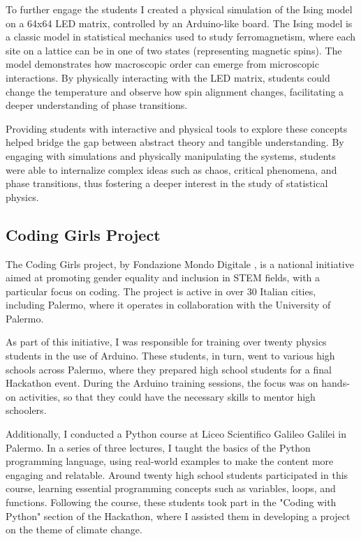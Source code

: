 \documentclass[a4paper, 10pt]{scrartcl}
\begin{document}
To further engage the students I created a physical simulation of the Ising model on a 64x64 LED matrix, controlled by an Arduino-like board. The Ising model is a classic model in statistical mechanics used to study ferromagnetism, where each site on a lattice can be in one of two states (representing magnetic spins). The model demonstrates how macroscopic order can emerge from microscopic interactions. By physically interacting with the LED matrix, students could change the temperature and observe how spin alignment changes, facilitating a deeper understanding of phase transitions.

Providing students with interactive and physical tools to explore these concepts helped bridge the gap between abstract theory and tangible understanding. By engaging with simulations and physically manipulating the systems, students were able to internalize complex ideas such as chaos, critical phenomena, and phase transitions, thus fostering a deeper interest in the study of statistical physics.

\subsection*{Coding Girls Project}

The Coding Girls project, by Fondazione Mondo Digitale \cite{noauthor_coding_2022}, is a national initiative aimed at promoting gender equality and inclusion in STEM fields, with a particular focus on coding. The project is active in over 30 Italian cities, including Palermo, where it operates in collaboration with the University of Palermo.

As part of this initiative, I was responsible for training over twenty physics students in the use of Arduino. These students, in turn, went to various high schools across Palermo, where they prepared high school students for a final Hackathon event. During the Arduino training sessions, the focus was on hands-on activities, so that they could have the necessary skills to mentor high schoolers.

Additionally, I conducted a Python course at Liceo Scientifico Galileo Galilei in Palermo. In a series of three lectures, I taught the basics of the Python programming language, using real-world examples to make the content more engaging and relatable. Around twenty high school students participated in this course, learning essential programming concepts such as variables, loops, and functions. Following the course, these students took part in the "Coding with Python" section of the Hackathon, where I assisted them in developing a project on the theme of climate change.
\end{document}
